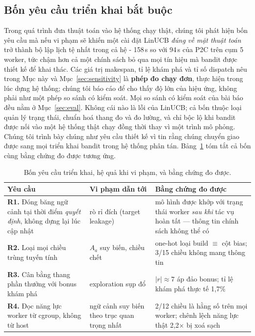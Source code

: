 \documentclass[final,5p,times,twocolumn]{elsarticle}
\begin{document}
\subsection{Bốn yêu cầu triển khai bắt buộc}
\label{sec:reqs}

Trong quá trình đưa thuật toán vào hệ thống chạy thật, chúng tôi phát hiện bốn yêu cầu mà nếu vi phạm sẽ khiến một cài đặt LinUCB \emph{đúng về mặt thuật toán} trở thành bộ lập lịch tệ nhất trong cả hệ - 158\,s so với 94\,s của P2C trên cụm 5 worker, tức chậm hơn cả một chính sách bỏ qua mọi tín hiệu mà bandit được thiết kế để khai thác. Các giá trị makespan, tỉ lệ khám phá và tỉ số dispatch nêu trong Mục này và Mục~\ref{sec:sensitivity} là \textbf{phép đo chạy đơn}, thực hiện trong lúc dựng hệ thống; chúng tôi báo cáo để cho thấy độ lớn của hiệu ứng, không phải như một phép so sánh có kiểm soát. Mọi so sánh có kiểm soát của bài báo đều nằm ở Mục~\ref{sec:eval}. Không cái nào là lỗi của LinUCB; cả bốn thuộc loại quản lý trạng thái, chuẩn hoá thang đo và đo lường, và chỉ bộc lộ khi bandit được nối vào một hệ thống thật chạy đồng thời thay vì một trình mô phỏng. Chúng tôi trình bày chúng như yêu cầu thiết kế vì tin rằng chúng chuyển giao được sang mọi triển khai bandit trong hệ thống phân tán. Bảng~\ref{tab:reqs} tóm tắt cả bốn cùng bằng chứng đo được tương ứng.

\begin{table}[t]
\centering
\caption{Bốn yêu cầu triển khai, hệ quả khi vi phạm, và bằng chứng đo được.}
\label{tab:reqs}
\small
\begin{tabular}{p{5.0cm}p{4.0cm}p{7.0cm}}
\toprule
Yêu cầu & Vi phạm dẫn tới & Bằng chứng đo được \\
\midrule
\textbf{R1.} Đóng băng ngữ cảnh tại thời điểm \emph{quyết định}, không dựng lại lúc cập nhật & rò rỉ đích (target leakage) & mô hình được khớp với trạng thái worker \emph{sau khi} tác vụ hoàn tất --- thông tin chính sách không thể có \\
\addlinespace
\textbf{R2.} Loại mọi chiều trùng tuyến tính & $A_a$ suy biến, chiều chết & one-hot loại build $\equiv$ cột bias; 3/15 chiều không mang thông tin \\
\addlinespace
\textbf{R3.} Cân bằng thang phần thưởng với bonus khám phá & exploration sụp đổ & $|r|\approx7$ áp đảo bonus; tỉ lệ khám phá thực tế 1,7\% \\
\addlinespace
\textbf{R4.} Đọc năng lực worker từ cgroup, không từ host & ngữ cảnh suy biến theo trục quan trọng nhất & 2/12 chiều là hằng số trên mọi worker; chênh lệch năng lực thật 2,2$\times$ bị xoá sạch \\
\bottomrule
\end{tabular}
\end{table}
\end{document}
